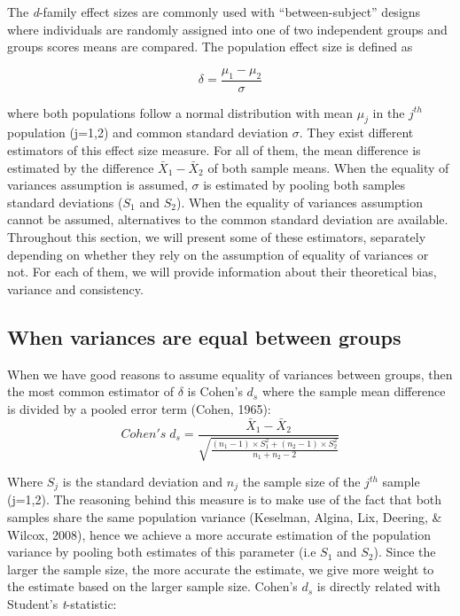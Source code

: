 \documentclass[
  man,floatsintext]{apa6}
\begin{document}
The \emph{d}-family effect sizes are commonly used with \enquote{between-subject} designs where individuals are randomly assigned into one of two independent groups and groups scores means are compared. The population effect size is defined as

\begin{equation} 
\delta = \frac{\mu_{1}-\mu_{2}}{\sigma} 
\label{eq:Cohendelta}
\end{equation}

where both populations follow a normal distribution with mean \(\mu_j\) in the \(j^{th}\) population (j=1,2) and common standard deviation \(\sigma\). They exist different estimators of this effect size measure. For all of them, the mean difference is estimated by the difference \(\bar{X}_1-\bar{X}_2\) of both sample means. When the equality of variances assumption is assumed, \(\sigma\) is estimated by pooling both samples standard deviations (\(S_1\) and \(S_2\)). When the equality of variances assumption cannot be assumed, alternatives to the common standard deviation are available. Throughout this section, we will present some of these estimators, separately depending on whether they rely on the assumption of equality of variances or not. For each of them, we will provide information about their theoretical bias, variance and consistency.

\hypertarget{when-variances-are-equal-between-groups}{%
\subsection{When variances are equal between groups}\label{when-variances-are-equal-between-groups}}

When we have good reasons to assume equality of variances between groups, then the most common estimator of \(\delta\) is Cohen's \(d_{s}\) where the sample mean difference is divided by a pooled error term (Cohen, 1965):
\begin{equation} 
Cohen's \; d_s = \frac{\bar{X}_1-\bar{X}_2}{\sqrt{\frac{(n_1-1) \times S_1^2+(n_2-1) \times S_2^2}{n_1+n_2-2}}}
\label{eq:Cohends}
\end{equation}

Where \(S_j\) is the standard deviation and \(n_j\) the sample size of the \(j^{th}\) sample (j=1,2). The reasoning behind this measure is to make use of the fact that both samples share the same population variance (Keselman, Algina, Lix, Deering, \& Wilcox, 2008), hence we achieve a more accurate estimation of the population variance by pooling both estimates of this parameter (i.e \(S_1\) and \(S_2\)). Since the larger the sample size, the more accurate the estimate, we give more weight to the estimate based on the larger sample size. Cohen's \(d_{s}\) is directly related with Student's \emph{t}-statistic:
\end{document}
